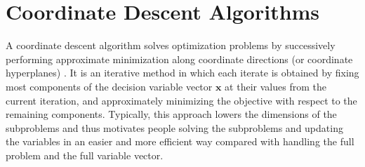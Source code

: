 \section{Coordinate Descent Algorithms}
A coordinate descent algorithm solves optimization problems by successively
performing approximate minimization along coordinate directions (or coordinate
hyperplanes)
\cite{COORD_DESCENT_ALGO}.
It is an iterative method in which each iterate is obtained by fixing most
components of the decision variable vector $\bm x$ at their values from the
current iteration, and approximately minimizing the objective with respect to
the remaining components.
Typically, this approach lowers the dimensions of the subproblems and thus
motivates people solving the subproblems and updating the variables in an
easier and more efficient way compared with handling the full problem and the
full variable vector.

